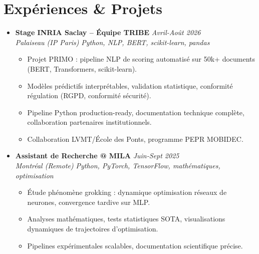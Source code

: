 \documentclass[a4paper,11pt]{article}
\begin{document}
\section{Exp\'eriences \& Projets}
\begin{itemize}[leftmargin=*, label={-}]
    \item \textbf{Stage INRIA Saclay -- \'Equipe TRIBE} \hfill \textit{Avril-Ao\^ut 2026} \\
    \textit{Palaiseau (IP Paris)} \hfill \textit{Python, NLP, BERT, scikit-learn, pandas}
    \vspace{-2pt}
    \begin{itemize}[leftmargin=0.4cm, nosep, label=\tiny$\bullet$]
        \item \small{Projet PRIMO : pipeline NLP de scoring automatis\'e sur 50k+ documents (BERT, Transformers, scikit-learn).}
        \item \small{Mod\`eles pr\'edictifs interpr\'etables, validation statistique, conformit\'e r\'egulation (RGPD, conformit\'e s\'ecurit\'e).}
        \item \small{Pipeline Python production-ready, documentation technique compl\`ete, collaboration partenaires institutionnels.}
        \item \small{Collaboration LVMT/\'Ecole des Ponts, programme PEPR MOBIDEC.}
    \end{itemize}
    \vspace{3pt}

    \item \textbf{Assistant de Recherche @ MILA} \hfill \textit{Juin-Sept 2025} \\
    \textit{Montr\'eal (Remote)} \hfill \textit{Python, PyTorch, TensorFlow, math\'ematiques, optimisation}
    \vspace{-2pt}
    \begin{itemize}[leftmargin=0.4cm, nosep, label=\tiny$\bullet$]
        \item \small{\'Etude ph\'enomène grokking : dynamique optimisation r\'eseaux de neurones, convergence tardive sur MLP.}
        \item \small{Analyses math\'ematiques, tests statistiques SOTA, visualisations dynamiques de trajectoires d'optimisation.}
        \item \small{Pipelines exp\'erimentales scalables, documentation scientifique pr\'ecise.}
    \end{itemize}
    \vspace{3pt}


\end{itemize}
\end{document}
